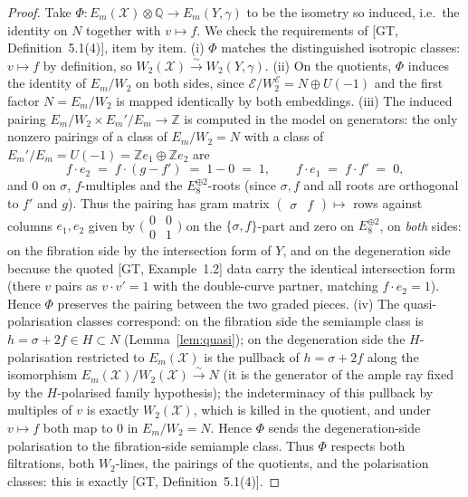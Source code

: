 \documentclass[11pt]{article}
\newcommand{\X}{\mathcal{X}}
\newcommand{\bZ}{\mathbb{Z}}
\newcommand{\bQ}{\mathbb{Q}}
\newcommand{\cE}{\mathcal{E}}
\begin{document}
\begin{proof}
Take $\Phi\colon E_m(\X)\otimes\bQ \to E_m(Y,\gamma)$ to be the isometry
so induced, i.e.\ the identity on $N$ together with $v\mapsto f$. We
check the requirements of [GT, Definition~5.1(4)], item by item.
(i) $\Phi$ matches the distinguished isotropic classes: $v\mapsto f$ by
definition, so $W_2(\X)\xrightarrow{\sim}W_2(Y,\gamma)$. (ii) On the
quotients, $\Phi$ induces the identity of $E_m/W_2$ on both sides,
since $\cE/W_2^{\cE}=N\oplus U(-1)$ and the first factor $N=E_m/W_2$ is
mapped identically by both embeddings. (iii) The induced pairing
$E_m/W_2 \times E_m'/E_m \to \bZ$ is computed in the model on
generators: the only nonzero pairings of a class of $E_m/W_2=N$ with
a class of $E_m'/E_m=U(-1)=\bZ e_1\oplus\bZ e_2$ are
\[
f\cdot e_2 \;=\; f\cdot(g-f') \;=\; 1-0 \;=\; 1,
\qquad
f\cdot e_1 \;=\; f\cdot f' \;=\; 0,
\]
and $0$ on $\sigma$, $f$-multiples and the $E_8^{\oplus2}$-roots (since
$\sigma,f$ and all roots are orthogonal to $f'$ and $g$). Thus the
pairing has gram matrix $\begin{pmatrix}\sigma&f\end{pmatrix}
\mapsto$ rows against columns $e_1,e_2$ given by
$\bigl(\begin{smallmatrix}0&0\\0&1\end{smallmatrix}\bigr)$ on the
$\{\sigma,f\}$-part and zero on $E_8^{\oplus2}$, on \emph{both} sides:
on the fibration side by the intersection form of $Y$, and on the
degeneration side because the quoted [GT, Example~1.2] data carry the
identical intersection form (there $v$ pairs as $v\cdot v'=1$ with the
double-curve partner, matching $f\cdot e_2=1$). Hence $\Phi$ preserves
the pairing between the two graded pieces. (iv) The quasi-polarisation
classes correspond: on the fibration side the semiample class is
$h=\sigma+2f\in H\subset N$ (Lemma~\ref{lem:quasi}); on the degeneration
side the $H$-polarisation restricted to $E_m(\X)$ is the pullback of
$h=\sigma+2f$ along the isomorphism
$E_m(\X)/W_2(\X)\xrightarrow{\sim}N$ (it is the generator of the ample
ray fixed by the $H$-polarised family hypothesis); the indeterminacy of
this pullback by multiples of $v$ is exactly $W_2(\X)$, which is killed
in the quotient, and under $v\mapsto f$ both map to $0$ in
$E_m/W_2=N$. Hence $\Phi$ sends the degeneration-side polarisation to
the fibration-side semiample class. Thus $\Phi$ respects both
filtrations, both $W_2$-lines, the pairings of the quotients, and the
polarisation classes: this is exactly [GT, Definition~5.1(4)].

\end{proof}
\end{document}
